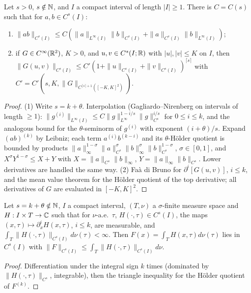 \begin{lemma}
  \label{lem:c03_holder_calculus}
  Let $s>0$, $s\notin\mathbb{N}$, and $I$ a compact interval of length $|I|\ge1$. There is $C=C(s)$ such that for $a,b\in C^s(I)$:
  \begin{enumerate}
    \item $\|ab\|_{C^s(I)}\le C(\|a\|_{L^\infty(I)}\|b\|_{C^s(I)}+\|a\|_{C^s(I)}\|b\|_{L^\infty(I)})$;
    \item if $G\in C^\infty(\mathbb{R}^2)$, $K>0$, and $u,v\in C^s(I;\mathbb{R})$ with $|u|,|v|\le K$ on $I$, then
      $\|G(u,v)\|_{C^s(I)}\le C'(1+\|u\|_{C^s(I)}+\|v\|_{C^s(I)})^{\lceil s\rceil}$ with $C'=C'(s,K,\|G\|_{C^{\lceil s\rceil+1}([-K,K]^2)})$.
  \end{enumerate}
\end{lemma}
\begin{proof}
  (1) Write $s=k+\theta$. Interpolation (Gagliardo--Nirenberg on intervals of length $\ge1$): $\|g^{(i)}\|_{L^\infty(I)}\le C\|g\|_{L^\infty}^{1-i/s}\|g\|_{C^s}^{i/s}$ for $0\le i\le k$, and the analogous bound for the $\theta$-seminorm of $g^{(i)}$ with exponent $(i+\theta)/s$.
  Expand $(ab)^{(k)}$ by Leibniz; each term $a^{(i)}b^{(k-i)}$ and its $\theta$-H\"older quotient is bounded by products
  $\|a\|_\infty^{1-\sigma}\|a\|_{C^s}^{\sigma}\|b\|_\infty^{\sigma}\|b\|_{C^s}^{1-\sigma}$, $\sigma\in[0,1]$, and
  $X^{\sigma}Y^{1-\sigma}\le X+Y$ with $X=\|a\|_{C^s}\|b\|_\infty$, $Y=\|a\|_\infty\|b\|_{C^s}$. Lower derivatives are handled the same way.
  (2) Fa\`a di Bruno for $\partial^i[G(u,v)]$, $i\le k$, and the mean value theorem for the H\"older quotient of the top derivative; all derivatives of $G$ are evaluated in $[-K,K]^2$.
\end{proof}

\begin{lemma}
  \label{lem:c03_parametric_holder}
  Let $s=k+\theta\notin\mathbb{N}$, $I$ a compact interval, $(T,\nu)$ a $\sigma$-finite measure space and $H:I\times T\to\mathbb{C}$ such that
  for $\nu$-a.e.\ $\tau$, $H(\cdot,\tau)\in C^s(I)$, the maps $(x,\tau)\mapsto\partial_x^iH(x,\tau)$, $i\le k$, are measurable, and
  $\int_T\|H(\cdot,\tau)\|_{C^s(I)}d\nu(\tau)<\infty$. Then $F(x)=\int_TH(x,\tau)d\nu(\tau)$ lies in $C^s(I)$ with
  $\|F\|_{C^s(I)}\le\int_T\|H(\cdot,\tau)\|_{C^s(I)}d\nu$.
\end{lemma}
\begin{proof}
  Differentiation under the integral sign $k$ times (dominated by $\|H(\cdot,\tau)\|_{C^s}$, integrable), then the triangle inequality for the H\"older quotient of $F^{(k)}$.
\end{proof}


